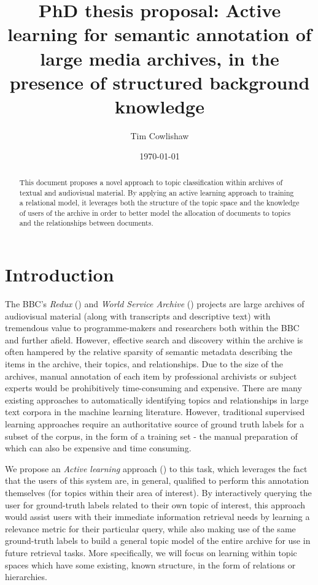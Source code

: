 \documentclass[a4paper, 11pt]{article}
\title{PhD thesis proposal: Active learning for semantic annotation of large media archives, in the presence of structured background knowledge}
\author{Tim Cowlishaw}
\date{\today}
\begin{document}
\maketitle
\begin{abstract}
  This document proposes a novel approach to topic classification within archives of textual and audiovisual material. By applying an active learning approach to training a relational model, it leverages both the structure of the topic space and the knowledge of users of the archive in order to better model the allocation of documents to topics and the relationships between documents.
\end{abstract}
\section{Introduction}
The BBC's \textit{Redux} (\cite{Butterworth2008}) and \textit{World Service Archive} (\cite{Raimond}) projects are large archives of audiovisual material (along with transcripts and descriptive text) with tremendous value to programme-makers and researchers both within the BBC and further afield. However, effective search and discovery within the archive is often hampered by the relative sparsity of semantic metadata describing the items in the archive, their topics, and relationships. Due to the size of the archives, manual annotation of each item by professional archivists or subject experts would be prohibitively time-consuming and expensive. There are many existing approaches to automatically identifying topics and relationships in large text corpora in the machine learning literature. However, traditional supervised learning approaches require an authoritative source of ground truth labels for a subset of the corpus, in the form of a training set - the manual preparation of which can also be expensive and time consuming.

We propose an \textit{Active learning} approach (\cite{Settles2012}) to this task, which leverages the fact that the users of this system are, in general, qualified to perform this annotation themselves (for topics within their area of interest). By interactively querying the user for ground-truth labels related to their own topic of interest, this approach would assist users with their immediate information retrieval needs by learning a relevance metric for their particular query, while also making use of the same ground-truth labels to build a general topic model of the entire archive for use in future retrieval tasks. More specifically, we will focus on learning within topic spaces which have some existing, known structure, in the form of relations or hierarchies.
\end{document}
